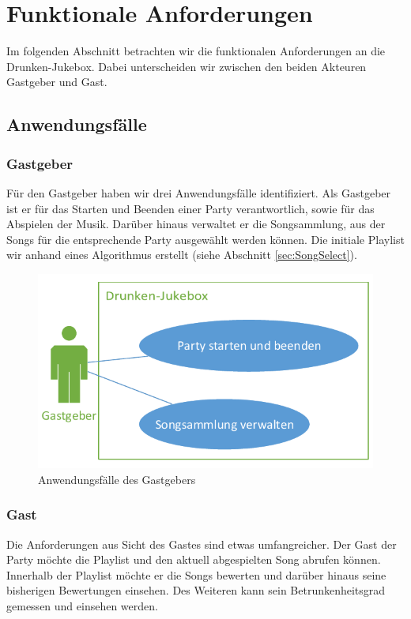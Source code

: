 \newpage
\section{Funktionale Anforderungen}
Im folgenden Abschnitt betrachten wir die funktionalen Anforderungen an die Drunken-Jukebox. Dabei unterscheiden wir zwischen den beiden Akteuren Gastgeber und Gast.

\subsection{Anwendungsfälle}
\subsubsection{Gastgeber}
Für den Gastgeber haben wir drei Anwendungsfälle identifiziert. Als Gastgeber ist er für das Starten und Beenden einer Party verantwortlich, sowie für das Abspielen der Musik. Darüber hinaus verwaltet er die Songsammlung, aus der Songs für die entsprechende Party ausgewählt werden können. Die initiale Playlist wir anhand eines Algorithmus erstellt (siehe Abschnitt \ref{sec:SongSelect}).

\begin{figure}[H]
\centering
\includegraphics[width=0.75\linewidth]{Bilder/AdminUseCase}
\caption{Anwendungsfälle des Gastgebers}
\label{fig:AdminUseCase}
\end{figure}

\newpage
\subsubsection{Gast}
Die Anforderungen aus Sicht des Gastes sind etwas umfangreicher. Der Gast der Party möchte die Playlist und den aktuell abgespielten Song abrufen können. Innerhalb der Playlist möchte er die Songs bewerten und darüber hinaus seine bisherigen Bewertungen einsehen. Des Weiteren kann sein Betrunkenheitsgrad gemessen und einsehen werden.

